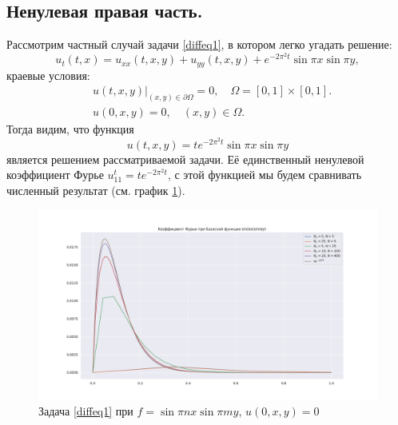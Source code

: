 \documentclass[14pt,a4paper]{extarticle}
\newcommand{\1}{\mathbbm{1}}
\begin{document}
\subsection{Ненулевая правая часть.}
Рассмотрим частный случай задачи \ref{diffeq1}, в котором легко угадать решение:
\begin{equation*} 
    u_t(t, x) = u_{xx}(t, x, y) + u_{yy}(t, x, y) + e^{-2 \pi^2 t} \sin \pi x \sin \pi y,
\end{equation*}
краевые условия:
\begin{align*} 
    &u(t, x, y) \big| _{(x ,y) \in \partial \Omega} = 0, \quad \Omega = [0,1] \times [0,1]. \\
    &u(0, x, y) = 0, \quad (x, y) \in \Omega. 
\end{align*}
Тогда видим, что функция
\begin{equation*}
    u(t, x, y) = t e^{-2 \pi^2 t} \sin \pi x \sin \pi y
\end{equation*}
является решением рассматриваемой задачи. Её единственный ненулевой коэффициент Фурье $u_{11}^t = t e^{-2 \pi^2 t}$, с этой функцией мы будем сравнивать численный результат (см. график \ref{tnzf}). 
\begin{figure}
    \centering
    \includegraphics[scale=0.4]{figs/nzf_test.pdf}
    \caption{Задача \ref{diffeq1} при $f = \sin \pi n x \sin \pi m y$, $u(0, x, y) = 0$}
    \label{tnzf}
\end{figure}
\end{document}
